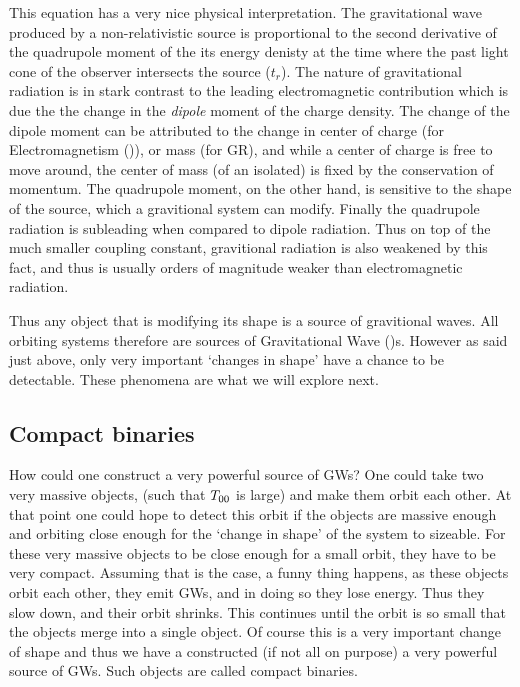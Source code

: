 \documentclass[
  letterpaper,
  DIV=11,
  numbers=noendperiod,
  oneside]{scrreprt}
\begin{document}
This equation has a very nice physical interpretation. The gravitational
wave produced by a non-relativistic source is proportional to the second
derivative of the quadrupole moment of the its energy denisty at the
time where the past light cone of the observer intersects the source
(\(t_r\)). The nature of gravitational radiation is in stark contrast to
the leading electromagnetic contribution which is due the the change in
the \emph{dipole} moment of the charge density. The change of the dipole
moment can be attributed to the change in center of charge (for
Electromagnetism ()), or mass (for {GR}), and while a center of charge
is free to move around, the center of mass (of an isolated) is fixed by
the conservation of momentum. The quadrupole moment, on the other hand,
is sensitive to the shape of the source, which a gravitional system can
modify. Finally the quadrupole radiation is subleading when compared to
dipole radiation. Thus on top of the much smaller coupling constant,
gravitional radiation is also weakened by this fact, and thus is usually
orders of magnitude weaker than electromagnetic radiation.

Thus any object that is modifying its shape is a source of gravitional
waves. All orbiting systems therefore are sources of
Gravitational Wave ()s. However as said just above, only very important
`changes in shape' have a chance to be detectable. These phenomena are
what we will explore next.

\hypertarget{sec-compactbinaries}{%
\subsection{Compact binaries}\label{sec-compactbinaries}}

How could one construct a very powerful source of {GW}s? One could take
two very massive objects, (such that
\(\texttip{\texttip{T}{Stress-Energy tensor, or energy-momentum tensor}_{00}}{covariant Stress-Energy tensor component}\)
is large) and make them orbit each other. At that point one could hope
to detect this orbit if the objects are massive enough and orbiting
close enough for the `change in shape' of the system to sizeable. For
these very massive objects to be close enough for a small orbit, they
have to be very compact. Assuming that is the case, a funny thing
happens, as these objects orbit each other, they emit {GW}s, and in
doing so they lose energy. Thus they slow down,
and their orbit shrinks. This continues until the orbit is so small that
the objects merge into a single object. Of course this is a very
important change of shape and thus we have a constructed (if not all on
purpose) a very powerful source of {GW}s. Such objects are called
compact binaries.
\end{document}
